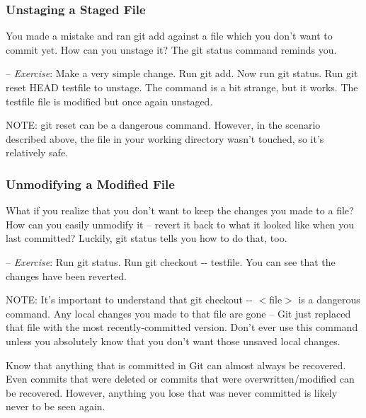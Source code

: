 \documentclass[12pt,a4]{article}
\newcommand{\ilcode}[1]{\textcolor[RGB]{160, 110, 220}{#1}}
\begin{document}
\subsubsection{Unstaging a Staged File}
You made a mistake and ran \ilcode{git add} against a file which you don't want
to commit yet. How can you unstage it? The \ilcode{git status} command reminds
you.

{\sf -- \emph{Exercise}:} Make a very simple change. Run \ilcode{git add}. Now
run \ilcode{git status}. Run \ilcode{git reset HEAD testfile} to unstage. The
command is a bit strange, but it works. The testfile file is modified but once
again unstaged.

{\sf NOTE:} \ilcode{git reset} can be a dangerous command. However, in the
scenario described above, the file in your working directory wasn't touched, so
it’s relatively safe.

\subsubsection{Unmodifying a Modified File}
What if you realize that you don’t want to keep the changes you made to a file?
How can you easily unmodify it -- revert it back to what it looked like when you
last committed? Luckily, \ilcode{git status} tells you how to do that, too.

{\sf -- \emph{Exercise}:} Run \ilcode{git status}. Run \ilcode{git checkout
-{}- testfile}. You can see that the changes have been reverted.

{\sf NOTE:} It’s important to understand that \ilcode{git checkout -{}-
$<$file$>$} is a dangerous command. Any local changes you made to that file are
gone -- Git just replaced that file with the most recently-committed version.
Don’t ever use this command unless you absolutely know that you don’t want those
unsaved local changes.

Know that anything that is committed in Git can almost always be recovered. Even
commits that were deleted or commits that were overwritten/modified can be
recovered. However, anything you lose that was never committed is likely never
to be seen again.
\end{document}
